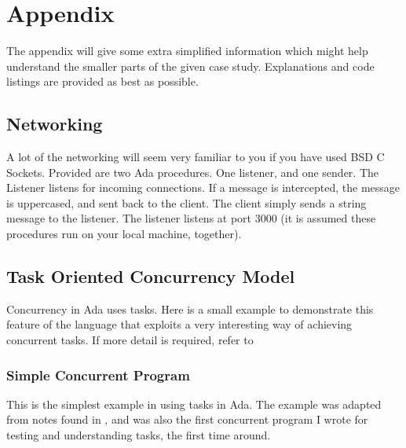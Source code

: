\section{Appendix}
The appendix will give some extra simplified information which might help understand the smaller parts of the given case study. Explanations and code listings are provided as best as possible.

\subsection{Networking}
A lot of the networking will seem very familiar to you if you have used BSD C Sockets. Provided are two Ada procedures. One listener, and one sender. The Listener listens for incoming connections. If a message is intercepted, the message is uppercased, and sent back to the client. 
The client simply sends a string message to the listener. The listener listens at port 3000 (it is assumed these procedures run on your local machine, together).




\subsection{Task Oriented Concurrency Model}
Concurrency in Ada uses tasks. Here is a small example to demonstrate this feature of the language that exploits a very interesting way of achieving concurrent tasks. If more detail is required, refer to \cite{AdaTasking}

\subsubsection{Simple Concurrent Program}
This is the simplest example in using tasks in Ada. The example was adapted from notes found in \cite{AdaConcurrent}, and was also the first concurrent program I wrote for testing and understanding tasks, the first time around.



